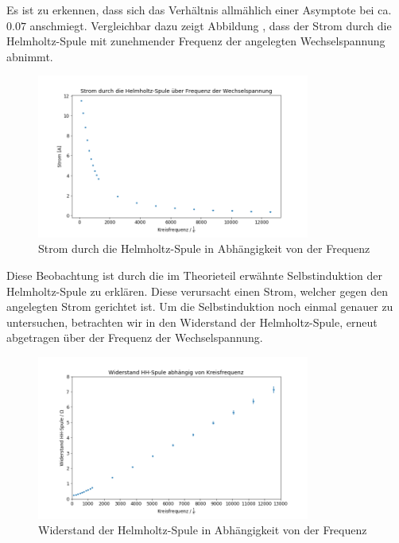 Es ist zu erkennen, dass sich das Verhältnis allmählich einer Asymptote bei ca. $0.07$ anschmiegt. Vergleichbar dazu zeigt Abbildung , dass der Strom durch die Helmholtz-Spule mit zunehmender Frequenz der angelegten Wechselspannung abnimmt.

\begin{figure}[H]
    \centering
    \includegraphics[width=0.8\textwidth]{files/i_by_acf.png}
    \caption{Strom durch die Helmholtz-Spule in Abhängigkeit von der Frequenz}
    \label{plot:i_by_acf}
\end{figure}

Diese Beobachtung ist durch die im Theorieteil erwähnte Selbstinduktion der Helmholtz-Spule zu erklären. Diese verursacht einen Strom, welcher gegen den angelegten Strom gerichtet ist. Um die Selbstinduktion noch einmal genauer zu untersuchen, betrachten wir in  den Widerstand der Helmholtz-Spule, erneut abgetragen über der Frequenz der Wechselspannung.

\begin{figure}[H]
    \centering
    \includegraphics[width=0.8\textwidth]{files/rhh_by_f.png}
    \caption{Widerstand der Helmholtz-Spule in Abhängigkeit von der Frequenz}
    \label{plot:rhh_by_f}
\end{figure}

